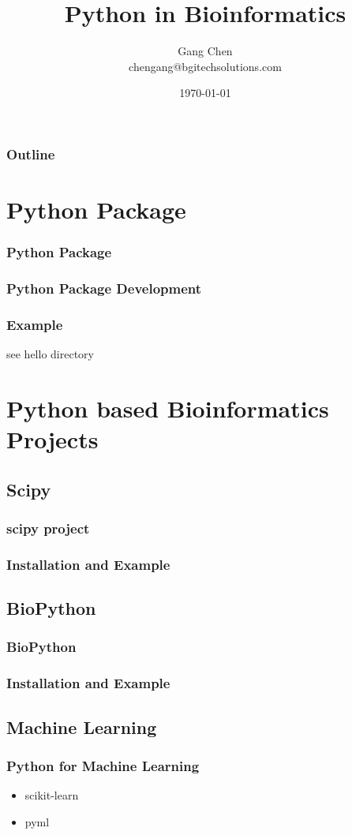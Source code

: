 \documentclass[UTF8]{beamer}
\title{Python in Bioinformatics}
\author{Gang Chen\\ chengang@bgitechsolutions.com}
\date{\today}
\begin{document}
\begin{frame}
\titlepage
\end{frame}

\begin{frame}[t]\frametitle{Outline}
\tableofcontents[hideallsubsections]
\end{frame}

\section{Python Package}
\begin{frame}
  \frametitle{Python Package}
\end{frame}

\begin{frame}
  \frametitle{Python Package Development}
\end{frame}

\begin{frame}
  \frametitle{Example}
  see hello directory
\end{frame}

\section{Python based Bioinformatics Projects}
\subsection{Scipy}
\begin{frame}
  \frametitle{scipy project}
\end{frame}

\begin{frame}
  \frametitle{Installation and Example}
\end{frame}
\subsection{BioPython}
\begin{frame}
  \frametitle{BioPython}
\end{frame}

\begin{frame}
  \frametitle{Installation and Example}
\end{frame}
\subsection{Machine Learning}
\begin{frame}
  \frametitle{Python for Machine Learning}
  \begin{itemize}
    \item scikit-learn
    \item pyml
  \end{itemize}
\end{frame}
\end{document}
